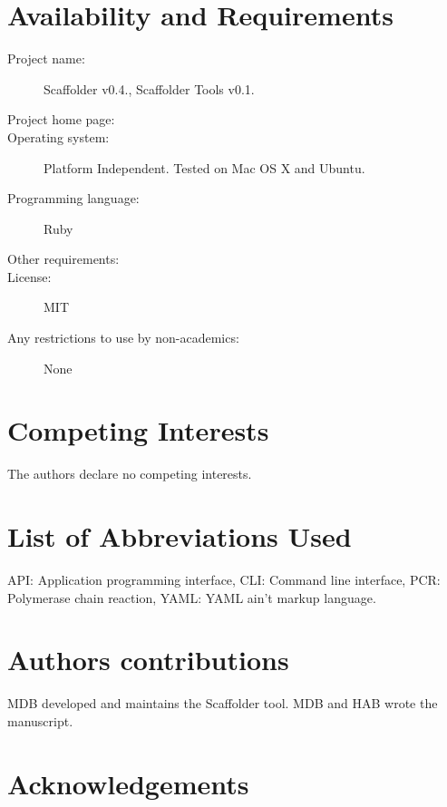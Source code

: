 \documentclass[10pt]{bmc_article}
\newenvironment{bmcformat}{\begin{raggedright}\baselineskip20pt\sloppy\setboolean{publ}{false}}{\end{raggedright}\baselineskip20pt\sloppy}
\begin{document}
\begin{bmcformat}
\clearpage

\section*{Availability and Requirements} %

  \begin{description}
    \item[Project name:] Scaffolder v0.4., Scaffolder Tools
    v0.1.
    \item[Project home page:] \scaffolder
    \item[Operating system:] Platform Independent. Tested on Mac OS X and
    Ubuntu.
    \item[Programming language:] Ruby 
    \item[Other requirements:] 
    \item[License:] MIT \item[Any restrictions to use by non-academics:] None
    \end{description}

\clearpage

\section*{Competing Interests} %

The authors declare no competing interests.

\section*{List of Abbreviations Used} %

API: Application programming interface, CLI: Command line interface, PCR:
Polymerase chain reaction, YAML: YAML ain't markup language\cite{yaml}.

\section*{Authors contributions} %

MDB developed and maintains the Scaffolder tool. MDB and HAB wrote the
manuscript.

\section*{Acknowledgements} %


\end{bmcformat}
\end{document}
